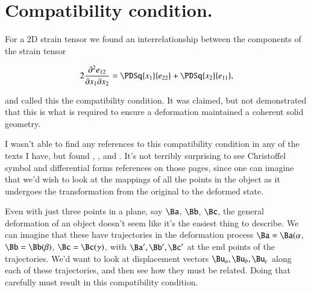 \section{Compatibility condition.}

For a 2D strain tensor we found an interrelationship between the components of the strain tensor

\begin{equation}\label{eqn:continuumElasticityReview:510}
2 \frac{\partial^2 e_{12}}{\partial x_1 \partial x_2} 
=
\PDSq{x_1}{e_{22}} 
+\PDSq{x_2}{e_{11}},
\end{equation}

and called this the compatibility condition.  It was claimed, but not demonstrated that this is what is required to ensure a deformation maintained a coherent solid geometry.

I wasn't able to find any references to this compatibility condition in any of the texts I have, but found \cite{wiki:compatibilityMechanics}, \cite{wiki:infinitesimalStrainTheory}, and \cite{wiki:saintVenantCompat}.  It's not terribly surprising to see Christoffel symbol and differential forms references on those pages, since one can imagine that we'd wish to look at the mappings of all the points in the object as it undergoes the transformation from the original to the deformed state.

Even with just three points in a plane, say $\Ba$, $\Bb$, $\Bc$, the general deformation of an object doesn't seem like it's the easiest thing to describe.  We can imagine that these have trajectories in the deformation process $\Ba = \Ba(\alpha$, $\Bb = \Bb(\beta)$, $\Bc = \Bc(\gamma)$, with $\Ba', \Bb', \Bc'$ at the end points of the trajectories.  We'd want to look at displacement vectors $\Bu_a, \Bu_b, \Bu_c$ along each of these trajectories, and then see how they must be related.  Doing that carefully must result in this compatibility condition.
